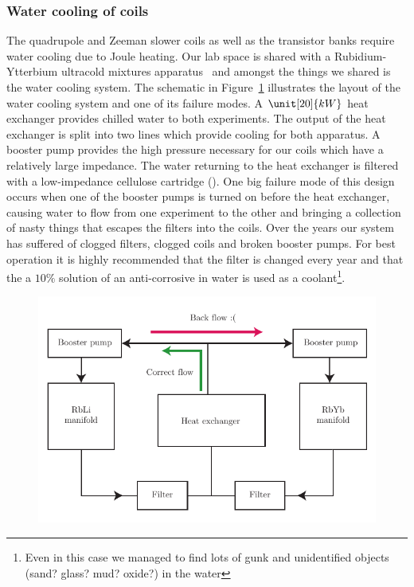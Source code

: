 \subsubsection{Water cooling of coils}
The quadrupole and Zeeman slower coils as well as the transistor banks require water cooling due to Joule heating. Our lab space is shared with a Rubidium-Ytterbium ultracold mixtures apparatus~\cite{HeroldThesis} and amongst the things we shared is the water cooling system. The schematic in Figure~\ref{fig:water_cooling} illustrates the layout of the water cooling system and one of its failure modes. A $\unit[20]{kW}$  heat exchanger provides chilled water to both experiments. The output of the heat exchanger is split into two lines which provide cooling for both apparatus. A  booster pump provides the high pressure necessary for our coils which have a relatively large impedance. The water returning to the heat exchanger is filtered with a low-impedance cellulose cartridge (). One big failure mode of this design occurs when one of the booster pumps is turned on before the heat exchanger, causing water to flow from one experiment to the other and bringing a collection of nasty things that escapes the filters into the coils. Over the years our system has suffered of clogged filters, clogged coils and broken booster pumps. For best operation it is highly recommended that the filter is changed every year and that the a $10\%$ solution of an anti-corrosive  in water is used as a coolant\footnote{Even in this case we managed to find lots of gunk and unidentified objects (sand? glass? mud? oxide?) in the water}. 

\begin{figure}[htb]
\begin{center}
\includegraphics[]{Figures/Chapter4/water_cooling.pdf}
\caption[Water cooling manifold schematic]{}
\label{fig:water_cooling}
\end{center}
\end{figure}

